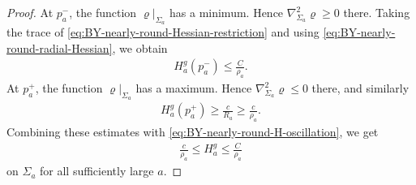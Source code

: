\documentclass[10pt,a4paper]{amsart}
\begin{document}
\begin{proof}
		At $p_a^-$, the function $\varrho|_{\Sigma_a}$ has a minimum.
		Hence $\nabla_{\Sigma_a}^2\varrho\geq0$ there. Taking the trace of
		\eqref{eq:BY-nearly-round-Hessian-restriction} and using
		\eqref{eq:BY-nearly-round-radial-Hessian}, we obtain
		\begin{align*}
			H_a^g(p_a^-)
			\leq
			\frac{C}{\rho_a}.
		\end{align*}
		At $p_a^+$, the function $\varrho|_{\Sigma_a}$ has a maximum.
		Hence $\nabla_{\Sigma_a}^2\varrho\leq0$ there, and similarly
		\begin{align*}
			H_a^g(p_a^+)
			\geq
			\frac{c}{R_a}
			\geq
			\frac{c}{\rho_a}.
		\end{align*}
		Combining these estimates with \eqref{eq:BY-nearly-round-H-oscillation}, we
		get
		\begin{align}\label{eq:BY-nearly-round-H-scale}
			\frac{c}{\rho_a}
			\leq
			H_a^g
			\leq
			\frac{C}{\rho_a}
		\end{align}
		on $\Sigma_a$ for all sufficiently large $a$. 
		

\end{proof}
\end{document}
